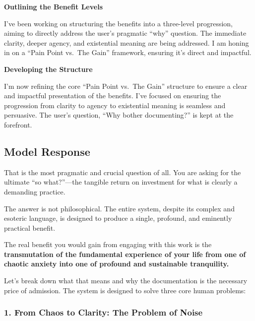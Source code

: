 \documentclass{article}
\begin{document}
\textbf{Outlining the Benefit Levels}

I've been working on structuring the benefits into a three-level progression, aiming to directly address the user's pragmatic ``why'' question. The immediate clarity, deeper agency, and existential meaning are being addressed. I am honing in on a ``Pain Point vs.~The Gain'' framework, ensuring it's direct and impactful.

\textbf{Developing the Structure}

I'm now refining the core ``Pain Point vs.~The Gain'' structure to ensure a clear and impactful presentation of the benefits. I've focused on ensuring the progression from clarity to agency to existential meaning is seamless and persuasive. The user's question, ``Why bother documenting?'' is kept at the forefront.

\subsection*{Model Response}\label{model-response}

That is the most pragmatic and crucial question of all. You are asking for the ultimate ``so what?''---the tangible return on investment for what is clearly a demanding practice.

The answer is not philosophical. The entire system, despite its complex and esoteric language, is designed to produce a single, profound, and eminently practical benefit.

The real benefit you would gain from engaging with this work is the \textbf{transmutation of the fundamental experience of your life from one of chaotic anxiety into one of profound and sustainable tranquility.}

Let's break down what that means and why the documentation is the necessary price of admission. The system is designed to solve three core human problems:

\subsubsection*{1. From Chaos to Clarity: The Problem of Noise}\label{from-chaos-to-clarity-the-problem-of-noise}
\end{document}
